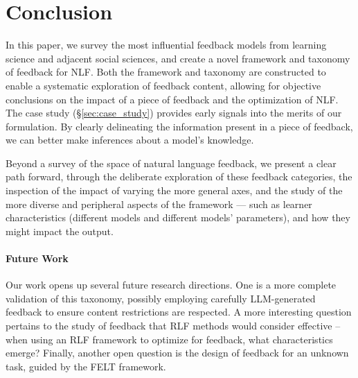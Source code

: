 \section{Conclusion}

In this paper, we survey the most influential feedback models from learning science and adjacent social sciences, and create a novel framework and taxonomy of feedback for NLF. Both the framework and taxonomy are constructed to enable a systematic exploration of feedback content, allowing for objective conclusions on the impact of a piece of feedback and the optimization of NLF.
The case study (\S\ref{sec:case_study}) provides early signals into the merits of our formulation.
By clearly delineating the information present in a piece of feedback, we can better make inferences about a model's knowledge. %


Beyond a survey of the space of natural language feedback, we present a clear path forward, through the deliberate exploration of these feedback categories, the inspection of the impact of varying the more general axes, and the study of the more diverse and peripheral aspects of the \ours framework --- such as learner characteristics (different models and different models' parameters), and how they might impact the output. 



\paragraph{Future Work}
Our work opens up several future research directions. One is a more complete validation of this taxonomy, possibly employing carefully LLM-generated feedback to ensure content restrictions are respected. A more interesting question pertains to the study of feedback that RLF methods would consider effective -- when using an RLF framework to optimize for feedback, what characteristics emerge? Finally, another open question is the design of feedback for an unknown task, guided by the FELT framework.